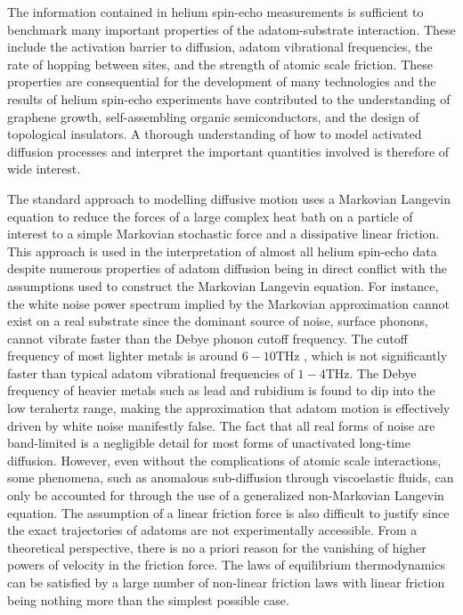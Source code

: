 \documentclass[7pt]{article}
\newcommand{\THz}{\si{\tera\hertz}}
\begin{document}
The information contained in helium spin-echo measurements is sufficient to benchmark many important properties of the adatom-substrate interaction. These include the activation barrier to diffusion, adatom vibrational frequencies, the rate of hopping between sites, and the strength of atomic scale friction\cite{Jardine200911, Lechner2015, Alexandrowicz, Hedgeland}. These properties are consequential for the development of many technologies and the results of helium spin-echo experiments have contributed to the understanding of graphene growth, self-assembling organic semiconductors, and the design of topological insulators\cite{Tamtgl2015, Townsend, Sacchi, Tamtgl2020}. A thorough understanding of how to model activated diffusion processes and interpret the important quantities involved is therefore of wide interest.
 
The standard approach to modelling diffusive motion uses a Markovian Langevin equation to reduce the forces of a large complex heat bath on a particle of interest to a simple Markovian stochastic force and a dissipative linear friction\cite{Kramers, Zwanzig, Kubo}. This approach is used in the interpretation of almost all helium spin-echo data\cite{Jardine200911, Jardine200906} despite numerous properties of adatom diffusion being in direct conflict with the assumptions used to construct the Markovian Langevin equation.  For instance, the white noise power spectrum implied by the Markovian approximation cannot exist on a real substrate since the dominant source of noise, surface phonons\cite{Rittmeyer2016}, cannot vibrate faster than the Debye phonon cutoff frequency. The cutoff frequency of most lighter metals is around $6-10\THz$ \cite{Sinha, Rao, Zarestky, Stedman1966}, which is not significantly faster than typical adatom vibrational frequencies of $1-4\THz$\cite{Ellis1995, Senet1999LowfrequencyVO, Hofmann1996}. The Debye frequency of heavier metals such as lead and rubidium is found to dip into the low terahertz range\cite{Brockhouse, Copley1973}, making the approximation that adatom motion is effectively driven by white noise manifestly false. The fact that all real forms of noise are band-limited is a negligible detail for most forms of unactivated long-time diffusion\cite{Townsend2018, GlattHoltz2020}. However, even without the complications of atomic scale interactions, some phenomena, such as anomalous sub-diffusion through viscoelastic fluids, can only be accounted for through the use of a generalized non-Markovian Langevin equation\cite{Kubo, GlattHoltz2020, Mason}. The assumption of a linear friction force is also difficult to justify since the exact trajectories of adatoms are not experimentally accessible. From a theoretical perspective, there is no a priori reason for the vanishing of higher powers of velocity in the friction force\cite{Kramers}. The laws of equilibrium thermodynamics can be satisfied by a large number of non-linear friction laws with linear friction being nothing more than the simplest possible case. 
\end{document}
